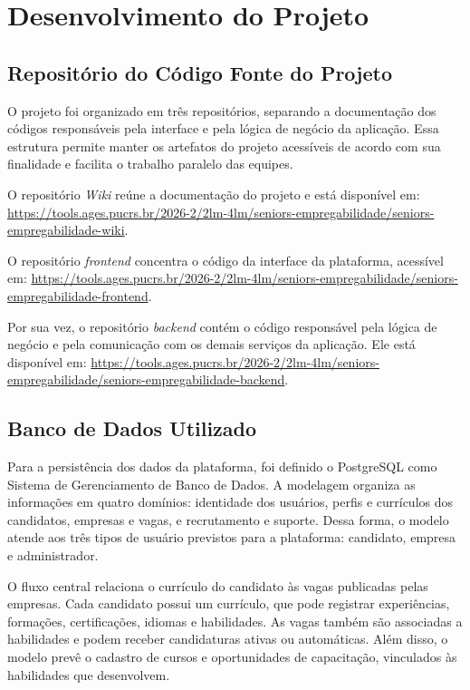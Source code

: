 \section[Desenvolvimento do Projeto]{Desenvolvimento do Projeto}

\subsection{Repositório do Código Fonte do Projeto}
O projeto foi organizado em três repositórios, separando a documentação dos
códigos responsáveis pela interface e pela lógica de negócio da aplicação. Essa
estrutura permite manter os artefatos do projeto acessíveis de acordo com sua
finalidade e facilita o trabalho paralelo das equipes.

O repositório \textit{Wiki} reúne a documentação do projeto e está disponível em:
\url{https://tools.ages.pucrs.br/2026-2/2lm-4lm/seniors-empregabilidade/seniors-empregabilidade-wiki}.

O repositório \textit{frontend} concentra o código da interface da plataforma,
acessível em:
\url{https://tools.ages.pucrs.br/2026-2/2lm-4lm/seniors-empregabilidade/seniors-empregabilidade-frontend}.

Por sua vez, o repositório \textit{backend} contém o código responsável pela
lógica de negócio e pela comunicação com os demais serviços da aplicação. Ele está
disponível em:
\url{https://tools.ages.pucrs.br/2026-2/2lm-4lm/seniors-empregabilidade/seniors-empregabilidade-backend}.

\subsection{Banco de Dados Utilizado}\label{subsec:seniors-banco}
Para a persistência dos dados da plataforma, foi definido o PostgreSQL como
Sistema de Gerenciamento de Banco de Dados. A modelagem organiza as informações em
quatro domínios: identidade dos usuários, perfis e currículos dos candidatos,
empresas e vagas, e recrutamento e suporte. Dessa forma, o modelo atende aos três
tipos de usuário previstos para a plataforma: candidato, empresa e administrador.

O fluxo central relaciona o currículo do candidato às vagas publicadas pelas
empresas. Cada candidato possui um currículo, que pode registrar experiências,
formações, certificações, idiomas e habilidades. As vagas também são associadas a
habilidades e podem receber candidaturas ativas ou automáticas. Além disso, o
modelo prevê o cadastro de cursos e oportunidades de capacitação, vinculados às
habilidades que desenvolvem.

